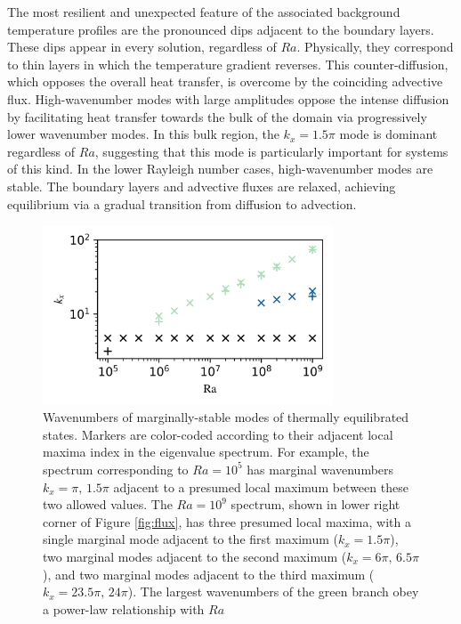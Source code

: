 \documentclass[reprint,amsmath,amssymb,aps]{revtex4-1}
\begin{document}
\par The most resilient and unexpected feature of the associated background temperature profiles are the pronounced dips adjacent to the boundary layers. These dips appear in every solution, regardless of $Ra$. Physically, they correspond to thin layers in which the temperature gradient reverses. This counter-diffusion, which opposes the overall heat transfer, is overcome by the coinciding advective flux. High-wavenumber modes with large amplitudes oppose the intense diffusion by facilitating heat transfer towards the bulk of the domain via progressively lower wavenumber modes. In this bulk region, the $k_x = 1.5\pi$ mode is dominant regardless of $Ra$, suggesting that this mode is particularly important for systems of this kind. In the lower Rayleigh number cases, high-wavenumber modes are stable. The boundary layers and advective fluxes are relaxed, achieving equilibrium via a gradual transition from diffusion to advection.

\begin{figure}[h]
    \centering
    \includegraphics[width=3.4in]{kx_m_ra1.png}
    \caption{Wavenumbers of marginally-stable modes of thermally equilibrated states. Markers are color-coded according to their adjacent local maxima index in the eigenvalue spectrum. For example, the spectrum corresponding to $Ra = 10^5$ has marginal wavenumbers $k_x = \pi, \, 1.5\pi$ adjacent to a presumed local maximum between these two allowed values. The $Ra = 10^9$ spectrum, shown in lower right corner of Figure \ref{fig:flux}, has three presumed local maxima, with a single marginal mode adjacent to the first maximum ($k_x = 1.5\pi$), two marginal modes adjacent to the second maximum ($k_x = 6\pi, \, 6.5\pi$), and two marginal modes adjacent to the third maximum ($k_x = 23.5\pi, \, 24\pi$). The largest wavenumbers of the green branch obey a power-law relationship with $Ra$}
    \label{fig:kx_marginals}
\end{figure}
\end{document}
